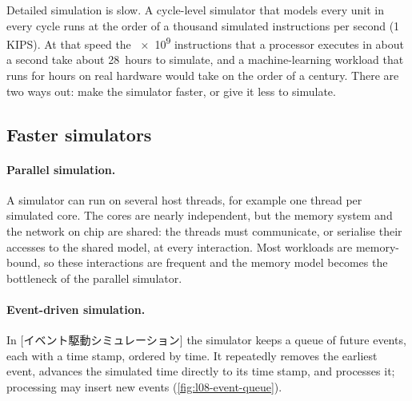 \documentclass[../main.tex]{subfiles}
\begin{document}
Detailed simulation is slow.
A cycle-level simulator that models every unit in every cycle runs at
the order of a thousand simulated instructions per second (\num{1}
KIPS).  At that speed the \num{e9} instructions that a processor
executes in about a second take about 28~hours to simulate, and a
machine-learning workload that runs for hours on real hardware would
take on the order of a century.  There are two ways out: make the
simulator faster, or give it less to simulate.

\subsection{Faster simulators}

\paragraph{Parallel simulation.}  A simulator can run on several host
threads, for example one thread per simulated core.  The cores are
nearly independent, but the memory system and the network on chip are
shared: the threads must communicate, or serialise their accesses to
the shared model, at every interaction.  Most workloads are
memory-bound, so these interactions are frequent and the memory model
becomes the bottleneck of the parallel simulator.

\paragraph{Event-driven simulation.}

\begin{definition}
  \label{def:l08-event-driven}
  In [イベント駆動シミュレーション]
  the simulator keeps a queue of future events, each with a time stamp,
  ordered by time.  It repeatedly removes the earliest event, advances
  the simulated time directly to its time stamp, and processes it;
  processing may insert new events (\cref{fig:l08-event-queue}).
\end{definition}
\end{document}
